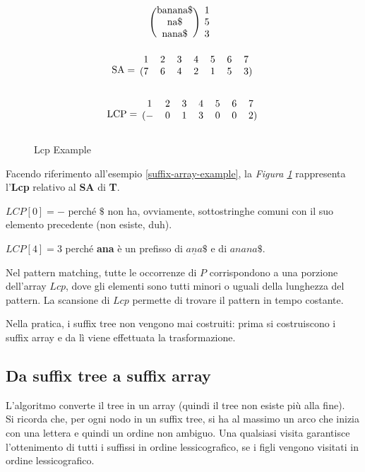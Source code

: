 \begin{figure}[H]
\begin{gather*}
\begin{blockarray}{cc}
\begin{block}{(c)c}
			\text{banana\$} & 1 \\
			\text{na\$} & 5 \\
			\text{nana\$} & 3 \\
		\end{block}
	\end{blockarray} \\
	\text{SA} = \begin{blockarray}{ccccccc}
		1 & 2 & 3 & 4 & 5 & 6 & 7 \\
		\begin{block}{(ccccccc)}
			7 & 6 & 4 & 2 & 1 & 5 & 3 \\
		\end{block}
	\end{blockarray}
	\end{gather*}
\end{figure}

\begin{figure}[H]
	\caption{Lcp Example}\label{Lcp-example}
	\begin{gather*}
		\text{LCP} = \begin{blockarray}{ccccccc}
			1 & 2 & 3 & 4 & 5 & 6 & 7 \\
			\begin{block}{(ccccccc)}
				- & 0 & 1 & 3 & 0 & 0 & 2 \\
			\end{block}
		\end{blockarray}
	\end{gather*}
\end{figure}

Facendo riferimento all'esempio \ref{suffix-array-example}, la \textit{Figura \ref{Lcp-example}} rappresenta l'\textbf{Lcp} relativo al \textbf{SA} di \textbf{T}.

$LCP[0] = -$ perché $\$$ non ha, ovviamente, sottostringhe comuni con il suo elemento precedente (non esiste, duh).

$LCP[4] = 3$ perché \textbf{ana} è un prefisso di $\underline{ana}\$$ e di $anana\$$.

Nel pattern matching, tutte le occorrenze di $P$ corrispondono a una porzione dell'array $Lcp$, dove gli elementi sono tutti minori o uguali della lunghezza del pattern. La scansione di $Lcp$ permette di trovare il pattern in tempo costante.

Nella pratica, i suffix tree non vengono mai costruiti: prima si costruiscono i suffix array e da lì viene effettuata la trasformazione.

\subsection{Da suffix tree a suffix array}
L'algoritmo converte il tree in un array (quindi il tree non esiste più alla fine). \\
Si ricorda che, per ogni nodo in un suffix tree, si ha al massimo un arco che inizia con una lettera e quindi un ordine non ambiguo. Una qualsiasi visita garantisce l'ottenimento di tutti i suffissi in ordine lessicografico, se i figli vengono visitati in ordine lessicografico.

